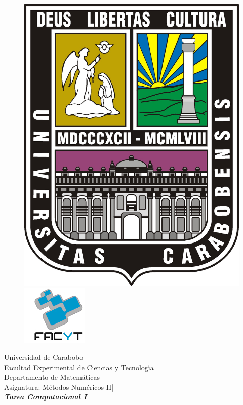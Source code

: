 \documentclass[12pt]{article}
\begin{document}

\begin{center}

\begin{figure}[!h]
\includegraphics[scale=0.2]{LogoUC.jpg}
  \label{fig:hoo}
   \hspace{14cm}\includegraphics[scale=0.6]{LogoFaCyT.jpg}
\end{figure}
 \vspace{-2,5cm}
Universidad de Carabobo \\ Facultad Experimental de Ciencias y
Tecnolog\'{\i}a \\ Departamento de Matem\'aticas\\ Asignatura:
M\'etodos Num\'ericos II|\\
\vspace{1cm} {\it\bf\large Tarea Computacional I}\\
\end{center}
\end{document}
